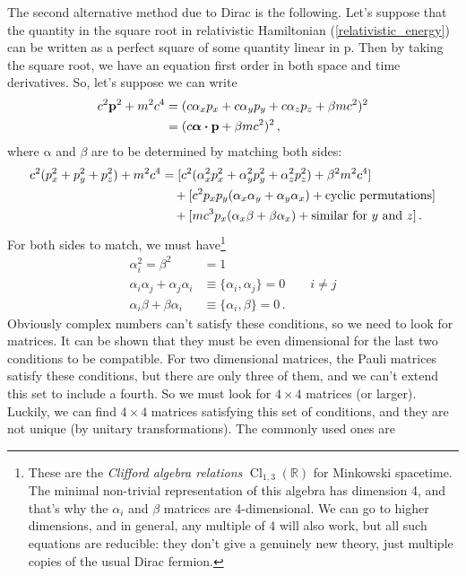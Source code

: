\documentclass{article}
\theoremstyle{plain}\theoremheaderfont{\normalfont\itshape}\theorembodyfont{\rmfamily}\theoremseparator{.}\newtheorem*{rem}{Remark}\newtheorem*{ex}{Example}\newtheorem*{proof}{Proof}\newtheorem*{altp}{Alternative proof}
\theoremstyle{plain}\theoremheaderfont{\normalfont\bfseries}\theorembodyfont{\rmfamily}\theoremseparator{.}\newtheorem{thm}{Theorem}[section]\newtheorem{lem}[thm]{Lemma}\newtheorem{prop}[thm]{Proposition}\newtheorem*{cor}{Corollary}\newtheorem{defn}[thm]{Definition}\newtheorem{clm}[thm]{Claim}\newtheorem{clminproof}{Claim}
\theoremstyle{break}\theoremheaderfont{\normalfont\itshape}\theorembodyfont{\rmfamily}\theoremseparator{.\medskip}\newtheorem*{proofskip}{Proof}\newtheorem*{exs}{Examples}\newtheorem*{rems}{Remarks}
\theoremstyle{break}\theoremheaderfont{\normalfont\bfseries}\theorembodyfont{\rmfamily}\theoremseparator{.\medskip}\newtheorem{lemskip}[thm]{Lemma}\newtheorem{defnskip}[thm]{Definition}\newtheorem{propskip}[thm]{Proposition}\newtheorem{thmskip}[thm]{Theorem}
\numberwithin{equation}{section}
\newcommand{\vb}[1]{\bm{\mathrm{#1}}}
\newcommand{\vdot}{\bm{\cdot}}
\begin{document}
    The second alternative method due to Dirac is the following. Let's suppose that the quantity in the square root in relativistic Hamiltonian (\ref{relativistic_energy}) can be written as a perfect square of some quantity linear in \(\vb{p}\). Then by taking the square root, we have an equation first order in both space and time derivatives. So, let's suppose we can write
    \begin{align}
        c^2\vb{p}^2+m^2c^4&=(c\alpha_xp_x+c\alpha_yp_y+c\alpha_zp_z+\beta mc^2)^2 \notag\\
        &=(c\vb{\alpha}\vdot\vb{p}+\beta mc^2)^2\,,
    \end{align}
    where \(\vb{\alpha}\) and \(\beta\) are to be determined by matching both sides:
    \begin{align}
        c^2(p_x^2+p_y^2+p_z^2)+m^2c^4&=[c^2(\alpha_x^2 p_x^2 + \alpha_y^2 p_y^2 + \alpha_z^2 p_z^2)+\beta^2m^2c^4]\notag \\
        &\quad +[c^2p_xp_y(\alpha_x\alpha_y+\alpha_y\alpha_x) + \text{cyclic permutations}]\notag\\
        &\quad + [mc^3p_x(\alpha_x\beta+\beta\alpha_x) + \text{similar for }y\text{ and }z]\,.
    \end{align}
    For both sides to match, we must have\footnote{These are the \textit{Clifford algebra relations} \(\operatorname{Cl}_{1,3}(\mathbb{R})\) for Minkowski spacetime. The minimal non-trivial representation of this algebra has dimension 4, and that's why the \(\alpha_i\) and \(\beta\) matrices are 4-dimensional. We can go to higher dimensions, and in general, any multiple of 4 will also work, but all such equations are reducible: they don't give a genuinely new theory, just multiple copies of the usual Dirac fermion.}
    \begin{align}
        \alpha_i^2=\beta^2&=1\\
        \alpha_i\alpha_j+\alpha_j\alpha_i&\equiv\{\alpha_i,\alpha_j\}=0 \qquad i\ne j \\
        \alpha_i\beta+\beta\alpha_i&\equiv\{\alpha_i,\beta\}=0\,.
    \end{align}
    Obviously complex numbers can't satisfy these conditions, so we need to look for matrices. It can be shown that they must be even dimensional for the last two conditions to be compatible. For two dimensional matrices, the Pauli matrices satisfy these conditions, but there are only three of them, and we can't extend this set to include a fourth. So we must look for \(4\times 4\) matrices (or larger). Luckily, we can find \(4\times 4\) matrices satisfying this set of conditions, and they are not unique (by unitary transformations). The commonly used ones are
\end{document}
